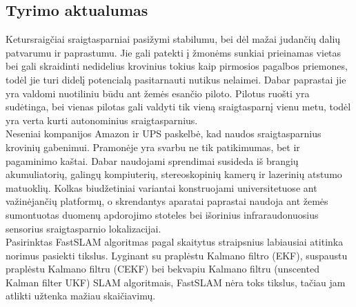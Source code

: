\documentclass[12pt, a4paper, lithuanian]{article}
\begin{document}
\begin{onehalfspacing}
  
\section{Tyrimo aktualumas}
Ketursraig\v{c}iai sraigtasparniai pasi\v{z}ymi stabilumu, bei d\.el ma\v{z}ai
 judan\v{c}i\k{u} dali\k{u} patvarumu ir paprastumu. Jie gali patekti \k{i} \v{z}mon\.ems
  sunkiai prieinamas vietas bei gali skraidinti nedidelius krovinius tokius kaip pirmosios
   pagalbos priemones, tod\.el jie turi didel\k{i} potencial\k{a} pasitarnauti nutikus 
   nelaimei. Dabar paprastai jie yra valdomi nuotiliniu b\=udu ant \v{z}em\.es esan\v{c}io
    piloto. Pilotus ruo\v{s}ti yra sud\.etinga, bei vienas pilotas gali valdyti tik 
    vien\k{a} sraigtasparn\k{i} vienu metu, tod\.el yra verta kurti 
    autonominius sraigtasparnius.\\
    \indent Neseniai kompanijos Amazon ir UPS paskelb\.e, kad naudos sraigtasparnius krovini\k{u} gabenimui. Pramon\.eje yra svarbu ne tik patikimumas, bet ir pagaminimo ka\v{s}tai. Dabar naudojami sprendimai susideda i\v{s} brangi\k{u} akumuliatori\k{u}, galing\k{u} kompiuteri\k{u}, stereoskopini\k{u} kamer\k{u} ir lazerini\k{u} atstumo matuokli\k{u}\cite{Nguyen2007}. Kolkas biud\v{z}etiniai variantai konstruojami universitetuose ant va\v{z}in\.ejan\v{c}i\k{u} platform\k{u}\cite{Vincke2010a}\cite{Longchamp2010}, o skrendantys aparatai paprastai naudoja ant \v{z}em\.es sumontuotas duomen\k{u} apdorojimo stoteles bei i\v{s}orinius infraraudonuosius sensorius sraigtasparnio lokalizacijai.
    \\
    \indent Pasirinktas FastSLAM algoritmas pagal skaitytus straipsnius labiausiai atitinka norimus pasiekti tikslus. Lyginant su prapl\.estu Kalmano filtro (EKF), suspaustu prapl\.estu Kalmano filtru (CEKF) bei bekvapiu Kalmano filtru (unscented Kalman filter UKF)\cite{6389151} SLAM algoritmais, FastSLAM n\.era toks tikslus, ta\v{c}iau jam atlikti u\v{z}tenka ma\v{z}iau skai\v{c}iavim\k{u}\cite{Zikos2011}. 



\end{onehalfspacing}
\end{document}
